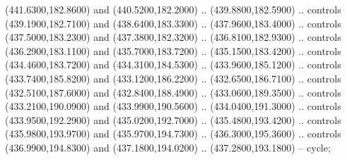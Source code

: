 {\begin{scope}[y=0.80pt, x=0.80pt, yscale=-1, xscale=1, inner sep=0pt, outer sep=0pt, #1]
      (441.6300,182.8600) and (440.5200,182.2000) .. (439.8800,182.5900) .. controls
      (439.1900,182.7100) and (438.6400,183.3300) .. (437.9600,183.4000) .. controls
      (437.5000,183.2300) and (437.3800,182.3200) .. (436.8100,182.9300) .. controls
      (436.2900,183.1100) and (435.7000,183.7200) .. (435.1500,183.4200) .. controls
      (434.4600,183.7200) and (434.3100,184.5300) .. (433.9600,185.1200) .. controls
      (433.7400,185.8200) and (433.1200,186.2200) .. (432.6500,186.7100) .. controls
      (432.5100,187.6000) and (432.8400,188.4900) .. (433.0600,189.3500) .. controls
      (433.2100,190.0900) and (433.9900,190.5600) .. (434.0400,191.3000) .. controls
      (433.9500,192.2900) and (435.0200,192.7000) .. (435.4800,193.4200) .. controls
      (435.9800,193.9700) and (435.9700,194.7300) .. (436.3000,195.3600) .. controls
      (436.9900,194.8300) and (437.1800,194.0200) .. (437.2800,193.1800) -- cycle;


\end{scope}}
